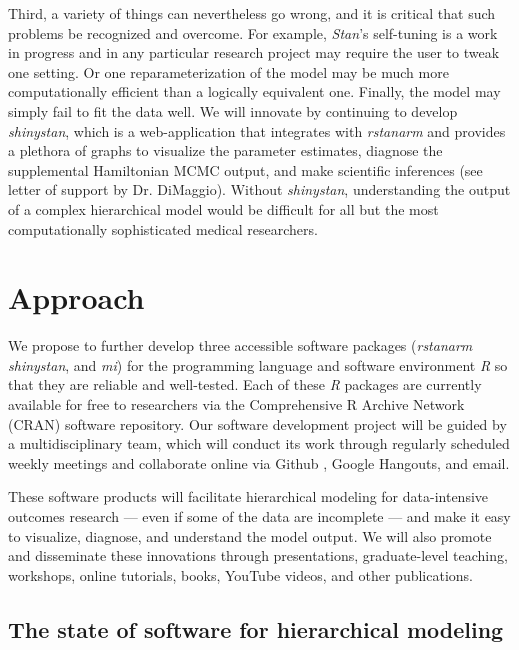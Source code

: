 \documentclass[11pt,notitlepage]{article}
\begin{document}
Third, a variety of things can nevertheless go wrong, and it is critical that such
problems be recognized and overcome. For example, \textit{Stan}'s self-tuning is a 
work in progress and in any particular research project may require the user to tweak 
one setting. Or one reparameterization of the model may be much more computationally efficient 
than a logically equivalent one. Finally, the model may simply fail to fit the data well.
We will innovate by continuing to develop \textit{shinystan}, which is a web-application
that integrates with \textit{rstanarm} and provides a plethora of graphs to visualize the 
parameter estimates, diagnose the supplemental Hamiltonian MCMC output, and make scientific
inferences (see letter of support by Dr. DiMaggio). Without \textit{shinystan}, understanding 
the output of a complex hierarchical model would be difficult for all but the most computationally 
sophisticated medical researchers.

\section*{Approach}

We propose to further develop three accessible software packages (\textit{rstanarm} 
\textit{shinystan}, and \textit{mi}) for the programming language and software environment 
\textit{R} so that they are reliable and well-tested. Each of these \textit{R} packages are currently available for 
free to researchers via the Comprehensive R Archive Network (CRAN) software repository. Our software development project will be guided by a multidisciplinary 
team, which will conduct its work through regularly scheduled weekly meetings and collaborate online via Github 
\cite{Chacon2009ProGit}, Google Hangouts, and email.

These software products will facilitate hierarchical modeling for data-intensive outcomes research ---
even if some of the data are incomplete --- and make it easy to visualize, diagnose, and understand the model
output. We will also promote and disseminate these innovations through presentations, graduate-level teaching, 
workshops, online tutorials, books, YouTube videos, and other publications.

\subsection*{The state of software for hierarchical modeling}
\end{document}
